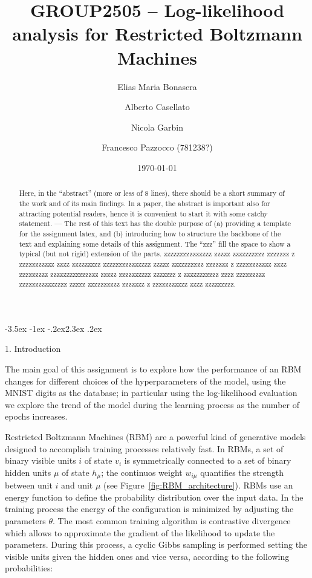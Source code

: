 \documentclass[prl,twocolumn]{revtex4-1}
\makeatletter
\renewcommand{\section}{\@startsection{section}{1}{\z@}%
	{-3.5ex \@plus -1ex \@minus -.2ex}{2.3ex \@plus.2ex}%
	{\normalfont\bfseries\raggedright}}
\makeatother
\begin{document}
\title{GROUP2505 -- Log-likelihood analysis for Restricted Boltzmann Machines}





\author{Elias Maria Bonasera}
\author{Alberto Casellato}
\author{Nicola Garbin}
\author{Francesco Pazzocco (781238?)}

\date{\today}


\begin{abstract}
  Here, in the ``abstract'' (more or less of 8 lines), there should be a short summary of the work and of its main findings. In a paper, the abstract is important also for attracting potential readers, hence it is convenient to start it with some catchy statement. ---
 The rest of this text has the double purpose of (a) providing a template for the assignment latex, and (b) introducing how to structure the backbone of the text and explaining some details of this assignment. The ``zzz'' fill the space to show a typical (but not rigid) extension of the parts.
  zzzzzzzzzzzzzzz zzzzz zzzzzzzzzz zzzzzzz z zzzzzzzzzzz zzzz zzzzzzzzz
  zzzzzzzzzzzzzzz zzzzz zzzzzzzzzz zzzzzzz z zzzzzzzzzzz zzzz zzzzzzzzz
  zzzzzzzzzzzzzzz zzzzz zzzzzzzzzz zzzzzzz z zzzzzzzzzzz zzzz zzzzzzzzz
  zzzzzzzzzzzzzzz zzzzz zzzzzzzzzz zzzzzzz z zzzzzzzzzzz zzzz zzzzzzzzz.
\end{abstract}

\maketitle


\section{1. Introduction}

The main goal of this assignment is to explore how the performance of an RBM changes for different choices of the hyperparameters of the model, using the MNIST digits as the database; in particular using the log-likelihood evaluation we explore the trend of the model during the learning process as the number of epochs increases.

Restricted Boltzmann Machines (RBM) are a powerful kind of generative models designed to accomplish training processes relatively fast. In RBMs, a set of binary visible units $i$ of state $v_i$ is symmetrically connected to a set of binary hidden units $\mu$ of state $h_\mu$; the continuos weight $w_{i\mu}$ quantifies the strength between unit $i$ and unit $\mu$ (see Figure~\ref{fig:RBM_architecture}). RBMs use an energy function to define the probability distribution over the input data. In the training process the energy of the configuration is minimized by adjusting the parameters $\theta$. The most common training algorithm is contrastive divergence which allows to approximate the gradient of the likelihood to update the parameters. During this process, a cyclic Gibbs sampling is performed setting the visible units given the hidden ones and vice versa, according to the following probabilities:
\end{document}
